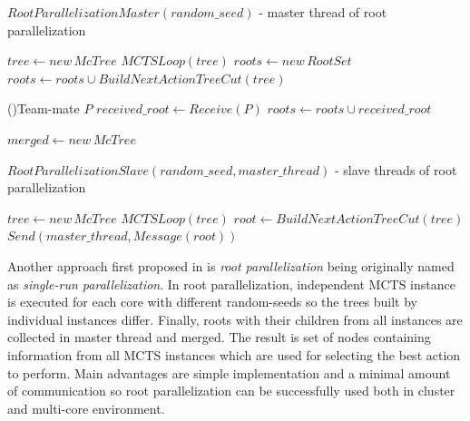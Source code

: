 \begin{algorithm}
\DontPrintSemicolon
\caption{$RootParallelizationMaster(random\_seed)$ - master thread of root parallelization}
\label{alg_root_parallelization_master}

$tree \leftarrow new\,McTree$ \;
$MCTSLoop(tree)$ \;
$roots \leftarrow new\,RootSet$ \;
$roots \leftarrow roots \cup BuildNextActionTreeCut(tree)$ \;

\ForEach(){Team-mate $P$}{
    $received\_root \leftarrow Receive(P)$ \;
    $roots \leftarrow roots \cup received\_root$\;
}

 \;
$merged \leftarrow new\,McTree$ \;

 \;
\end{algorithm}

\begin{algorithm}
\DontPrintSemicolon
\caption{$RootParallelizationSlave(random\_seed,master\_thread)$ - slave threads of root
parallelization}
\label{alg_root_parallelization_slave}
$tree \leftarrow new\,McTree$ \;
$MCTSLoop(tree)$ \;
$root \leftarrow BuildNextActionTreeCut(tree)$ \;
$Send(master\_thread, Message(root))$\;
\end{algorithm}

Another approach first proposed in \cite{Cazenave2007} is \emph{root parallelization} being
originally named as \emph{single-run parallelization}. In root parallelization, independent
MCTS instance is executed for each core with different random-seeds so the trees built by individual
instances differ. Finally, roots with their children from all instances are collected in master
thread and merged. The result is set of nodes containing information from all MCTS instances which
are used for selecting the best action to perform. Main advantages are simple implementation and a
minimal amount of communication so root parallelization can be successfully used both in cluster
and multi-core environment.

